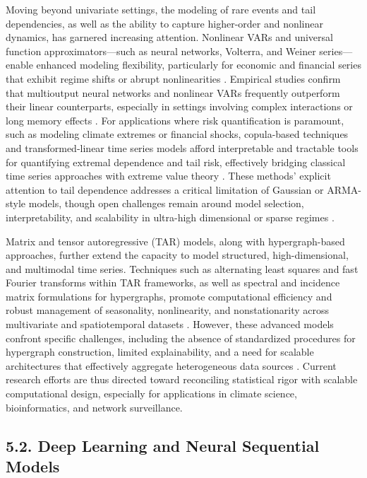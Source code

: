 \documentclass[11pt]{article}
\begin{document}
Moving beyond univariate settings, the modeling of rare events and tail dependencies, as well as the ability to capture higher-order and nonlinear dynamics, has garnered increasing attention. Nonlinear VARs and universal function approximators—such as neural networks, Volterra, and Weiner series—enable enhanced modeling flexibility, particularly for economic and financial series that exhibit regime shifts or abrupt nonlinearities \cite{ref56,ref67}. Empirical studies confirm that multioutput neural networks and nonlinear VARs frequently outperform their linear counterparts, especially in settings involving complex interactions or long memory effects \cite{ref67}. For applications where risk quantification is paramount, such as modeling climate extremes or financial shocks, copula-based techniques and transformed-linear time series models afford interpretable and tractable tools for quantifying extremal dependence and tail risk, effectively bridging classical time series approaches with extreme value theory \cite{ref49,ref50,ref58,ref59}. These methods' explicit attention to tail dependence addresses a critical limitation of Gaussian or ARMA-style models, though open challenges remain around model selection, interpretability, and scalability in ultra-high dimensional or sparse regimes \cite{ref49,ref58}.

Matrix and tensor autoregressive (TAR) models, along with hypergraph-based approaches, further extend the capacity to model structured, high-dimensional, and multimodal time series. Techniques such as alternating least squares and fast Fourier transforms within TAR frameworks, as well as spectral and incidence matrix formulations for hypergraphs, promote computational efficiency and robust management of seasonality, nonlinearity, and nonstationarity across multivariate and spatiotemporal datasets \cite{ref8,ref12,ref18,ref49,ref50,ref52,ref58,ref59,ref61,ref65}. However, these advanced models confront specific challenges, including the absence of standardized procedures for hypergraph construction, limited explainability, and a need for scalable architectures that effectively aggregate heterogeneous data sources \cite{ref52,ref59}. Current research efforts are thus directed toward reconciling statistical rigor with scalable computational design, especially for applications in climate science, bioinformatics, and network surveillance.

\subsection{5.2. Deep Learning and Neural Sequential Models}
\end{document}
